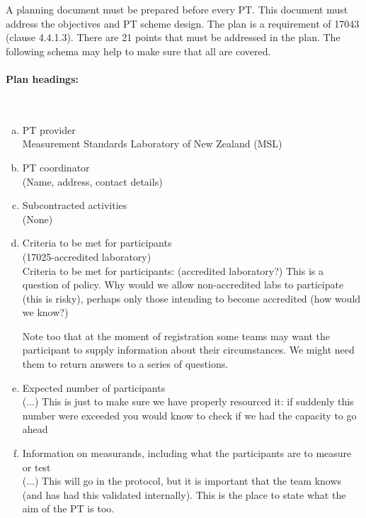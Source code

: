 A planning document must be prepared before every PT. This document must address the objectives and PT scheme design. The plan is a requirement of 17043 (clause 4.4.1.3). 
There are 21 points that must be addressed in the plan. The following schema may help to make sure that all are covered. 

\paragraph{Plan headings:}\mbox{}\\

\begin{enumerate}[a)]
\item	PT provider \\
Measurement Standards Laboratory of New Zealand (MSL)

\item	PT coordinator \\
(Name, address, contact details)

\item	Subcontracted activities \\
(None)

\item	Criteria to be met for participants \\
(17025-accredited laboratory) \\
Criteria to be met for participants:
(accredited laboratory?) This is a question of policy. Why would we allow non-accredited labs to participate (this is risky), perhaps only those intending to become accredited (how would we know?)

Note too that at the moment of registration some teams may want the participant to supply information about their circumstances. We might need them to return answers to a series of questions.

\item	Expected number of participants \\
(...) This is just to make sure we have properly resourced it: if suddenly this number were exceeded you would know to check if we had the capacity to go ahead

\item	Information on measurands, including what the participants are to measure or test \\
(...) This will go in the protocol, but it is important that the team knows (and has had this validated internally). This is the place to state what the aim of the PT is too.


\end{enumerate}
